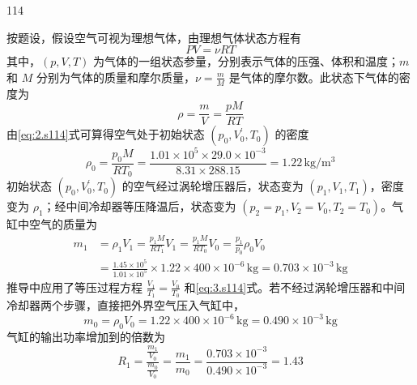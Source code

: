 \begin{solution}{114}
    \begin{subsolution}
        按题设，假设空气可视为理想气体，由理想气体状态方程有
        \begin{equation}
            PV = \nu RT
            \label{eq:1.s114}
        \end{equation}
        其中，$(p, V, T)$ 为气体的一组状态参量，分别表示气体的压强、体积和温度；$m$ 和 $M$ 分别为气体的质量和摩尔质量，$\nu = \frac{m}{M}$ 是气体的摩尔数。此状态下气体的密度为
        \begin{equation}
            \rho = \frac{m}{V} = \frac{p M}{R T}
            \label{eq:2.s114}
        \end{equation}
        由\eqref{eq:2.s114}式可算得空气处于初始状态 $(p_{0},V_{0}^{\prime},T_{0})$ 的密度
        \begin{equation}
            \rho_{0} = \frac{p_{0} M}{R T_{0}} = \frac{1.01 \times 10^{5} \times 29.0 \times 10^{-3}}{8.31 \times 288.15} = 1.22 \,\mathrm{kg/m^{3}}
            \label{eq:3.s114}
        \end{equation}
        初始状态 $(p_{0},V_{0}^{\prime},T_{0})$ 的空气经过涡轮增压器后，状态变为 $(p_{1},V_{1},T_{1})$，密度变为 $\rho_{1}$；经中间冷却器等压降温后，状态变为 $(p_{2}=p_{1},V_{2}=V_{0},T_{2}=T_{0})$。气缸中空气的质量为
        \begin{equation}
            \begin{aligned}
                m_{1} &= \rho_{1} V_{1} = \frac{p_{1} M}{R T_{1}} V_{1} = \frac{p_{1} M}{R T_{0}} V_{0} = \frac{p_{1}}{p_{0}} \rho_{0} V_{0} \\
                &= \frac{1.45 \times 10^{5}}{1.01 \times 10^{5}} \times 1.22 \times 400 \times 10^{-6} \,\mathrm{kg} = 0.703 \times 10^{-3} \,\mathrm{kg}
            \end{aligned}
            \label{eq:4.s114}
        \end{equation}
        推导中应用了等压过程方程 $\frac{V_{1}}{T_{1}}=\frac{V_{0}}{T_{0}}$ 和\eqref{eq:3.s114}式。若不经过涡轮增压器和中间冷却器两个步骤，直接把外界空气压入气缸中，
        \begin{equation}
            m_{0} = \rho_{0} V_{0} = 1.22 \times 400 \times 10^{-6} \,\mathrm{kg} = 0.490 \times 10^{-3} \,\mathrm{kg}
            \label{eq:5.s114}
        \end{equation}
        气缸的输出功率增加到的倍数为
        \begin{equation}
            R_{1} = \frac{\frac{m_{1}}{V_{0}}}{\frac{m_{0}}{V_{0}}} = \frac{m_{1}}{m_{0}} = \frac{0.703 \times 10^{-3}}{0.490 \times 10^{-3}} = 1.43

\end{equation}
\end{subsolution}
\end{solution}
